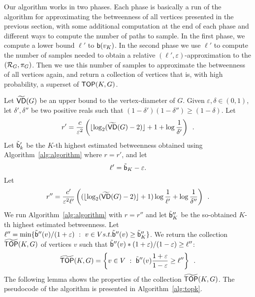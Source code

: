 Our algorithm works in two phases. Each phase is basically a run of the
algorithm for approximating the betweenness of all vertices presented in the
previous section, with some additional computation at the end of each phase and
different ways to compute the number of paths to sample. In the first phase,
we compute a lower bound $\ell'$ to $\mathsf{b}(v_K)$. In the second phase we use
$\ell'$ to compute the number of samples needed to obtain a relative
$(\ell',\varepsilon)$-approximation to the $(\mathcal{R}_G,\pi_G)$. Then we use this
number of samples to approximate the betweenness of all vertices again, and
return a collection of vertices that is, with high probability, a superset of
$\mathsf{TOP}(K,G)$.

Let $\widetilde{\mathsf{VD}}(G)$ be an upper bound to the vertex-diameter of $G$. Given
$\varepsilon,\delta\in(0,1)$, let $\delta',\delta''$ be two positive reals such
that $(1-\delta')(1-\delta'')\ge(1-\delta)$. Let
\[
r'=\frac{c}{\varepsilon^2}\left(\lfloor\log_2(\widetilde{\mathsf{VD}}(G)-2)\rfloor+1+\log\frac{1}{\delta'}\right)\enspace.
\]
Let $\tilde{\mathsf{b}}'_k$ be the $K$-th highest estimated betweenness obtained using
Algorithm~\ref{alg:algorithm} where $r=r'$, and let
\[
  \ell'=\tilde{\mathsf{b}}_K-\varepsilon.
\]
Let
\[
r''=\frac{c'}{\varepsilon^2\ell'}\left((\lfloor\log_2(\widetilde{\mathsf{VD}}(G)-2)\rfloor+1)\log\frac{1}{\ell'}+\log\frac{1}{\delta''}\right)\enspace.
\]
We run Algorithm~\ref{alg:algorithm} with $r=r''$ and let $\tilde{\mathsf{b}}''_K$ be
the so-obtained $K$-th highest estimated betweenness. Let
$\ell''=\min\{\tilde{\mathsf{b}}''(v) / (1+\varepsilon) ~:~ v\in V \relax{ s.t. }
\tilde{\mathsf{b}}''(v)\ge\tilde{\mathsf{b}}''_K\}$. We
return the collection $\widetilde{\mathsf{TOP}}(K,G)$ of vertices $v$ such that
$\tilde{\mathsf{b}}''(v)*(1+\varepsilon)/(1-\varepsilon)\ge\ell''$:
\[
\widetilde{\mathsf{TOP}}(K,G)= \left\{v\in V ~:~
\tilde{\mathsf{b}}''(v)\frac{1+\varepsilon}{1-\varepsilon}\ge\ell''\right\}\enspace.
\]
The following lemma shows the properties of the collection $\widetilde{\mathsf{TOP}}(K,G)$.
The pseudocode of the algorithm is presented in Algorithm~\ref{alg:topk}.

